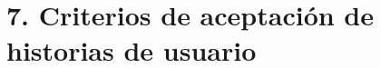 \documentclass[
11pt, %
]{charter}
\begin{document}

\section{7. Criterios de aceptación de historias de usuario}
\label{sec:criteriosAceptacion}



\end{document}
